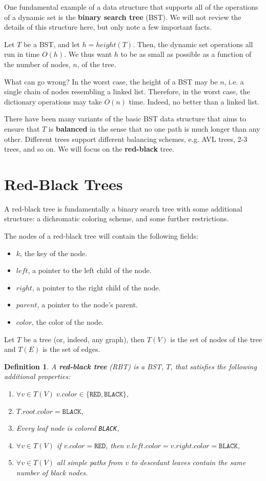 \documentclass[10pt]{article}
\newtheorem{definition}{Definition}[section]
\begin{document}
One fundamental example of a data structure that supports all of the
operations of a dynamic set is the \textbf{binary search tree} (BST). We will
not review the details of this structure here, but only note a few important
facts.

Let $T$ be a BST, and let $h = height(T)$. Then, the dynamic set operations
all run in time $O(h)$. We thus want $h$ to be as small as possible as a
function of the number of nodes, $n$, of the tree.

What can go wrong? In the worst case, the height of a BST may be $n$, i.e. a
single chain of nodes resembling a linked list. Therefore, in the worst case,
the dictionary operations may take $O(n)$ time. Indeed, no better than a linked list.

There have been many variants of the basic BST data structure that aims
to ensure that $T$ is \textbf{balanced} in the sense that no one path is
much longer than any other. Different trees support different balancing schemes,
e.g. AVL trees, 2-3 trees, and so on. We will focus on the \textbf{red-black}
tree.

\section{Red-Black Trees}

A red-black tree is fundamentally a binary search tree with
some additional structure: a dichromatic coloring scheme, and some further
restrictions.

The nodes of a red-black tree will contain
the following fields:
\begin{itemize}
  \item $k$, the key of the node.
  \item $left$, a pointer to the left child of the node.
  \item $right$, a pointer to the right child of the node.
  \item $parent$, a pointer to the node's parent.
  \item $color$, the color of the node.
\end{itemize}

Let $T$ be a tree (or, indeed, any graph), then $T(V)$ is the set of nodes
of the tree and $T(E)$ is the set of edges.

\begin{definition}
  A \textbf{red-black tree} (RBT) is a BST, $T$, that satisfies the following additional
  properties:
  \begin{enumerate}[label=\Roman*.]
    \item $\forall v \in T(V) \; v.color \in \{\texttt{RED}, \texttt{BLACK}\}$,
    \item $T.root.color = \texttt{BLACK}$,
    \item Every leaf node is colored \texttt{BLACK},
    \item $\forall v \in T(V)$ if $v.color = \texttt{RED}$,
      then $v.left.color = v.right.color = \texttt{BLACK}$,
    \item $\forall v \in T(V)$ all simple paths from $v$ to descedant leaves
      contain the same number of black nodes.
  \end{enumerate}
\end{definition}
\end{document}
